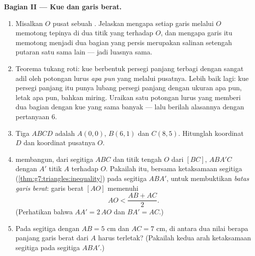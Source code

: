 \begin{problem}
\medskip
\noindent\textbf{Bagian II --- Kue dan garis berat.}
\begin{enumerate}[resume]
  \item Misalkan $O$ pusat sebuah . Jelaskan mengapa
        setiap garis melalui $O$ memotong tepinya di dua titik yang
         terhadap $O$, dan mengapa garis itu memotong
         menjadi dua bagian yang persis merupakan
        salinan setengah putaran satu sama lain --- jadi luasnya sama.
  \item Teorema tukang roti: kue berbentuk persegi panjang terbagi
        dengan sangat adil oleh potongan lurus \emph{apa pun} yang
        melalui pusatnya. Lebih baik lagi: kue persegi panjang itu
        punya lubang persegi panjang dengan ukuran apa pun, letak apa
        pun, bahkan miring. Uraikan satu potongan lurus yang memberi dua
        bagian dengan kue yang sama banyak --- lalu berilah alasannya
        dengan pertanyaan 6.
  \item Tiga   $ABCD$ adalah $A(0, 0)$,
        $B(6, 1)$ dan $C(8, 5)$. Hitunglah koordinat $D$
        dan koordinat pusatnya $O$.
  \item {} membangun, dari segitiga $ABC$
        dan titik tengah $O$ dari $[BC]$, 
        $ABA'C$ dengan $A'$ titik  $A$ terhadap $O$.
        Pakailah itu, bersama ketaksamaan segitiga
        (\cref{thm:g7:triangles:inequality}) pada segitiga
        $ABA'$, untuk membuktikan \emph{batas garis berat}: garis
        berat $[AO]$ memenuhi
        \[
        AO < \frac{AB + AC}{2} .
        \]
        (Perhatikan bahwa $AA' = 2\,AO$ dan $BA' = AC$.)
  \item Pada segitiga dengan $AB = 5$ cm dan $AC = 7$ cm, di antara
        dua nilai berapa panjang garis berat dari $A$ harus
        terletak? (Pakailah kedua arah ketaksamaan segitiga pada
        segitiga $ABA'$.)
\end{enumerate}


\end{problem}
